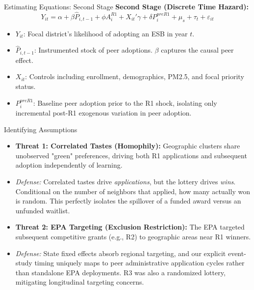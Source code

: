 \documentclass[aspectratio=169]{beamer}
\begin{document}
\begin{frame}{Estimating Equations: Second Stage}
    \textbf{Second Stage (Discrete Time Hazard):}
    $$ Y_{it} = \alpha + \beta \widehat{P}_{i,t-1} + \phi A_i^{R1} + X_{it}'\gamma + \delta P_i^{preR1} + \mu_s + \tau_t + \varepsilon_{it} $$
    
    \begin{itemize}
        \item \textbf{$Y_{it}$}: Focal district's likelihood of adopting an ESB in year $t$.
        \item \textbf{$\widehat{P}_{i,t-1}$}: Instrumented stock of peer adoptions. $\beta$ captures the causal peer effect.
        \item \textbf{$X_{it}$}: Controls including enrollment, demographics, PM2.5, and focal priority status.
        \item \textbf{$P_i^{preR1}$}: Baseline peer adoption prior to the R1 shock, isolating only incremental post-R1 exogenous variation in peer adoption.
    \end{itemize}
\end{frame}

\begin{frame}{Identifying Assumptions}
    \begin{itemize}
        \item \textbf{Threat 1: Correlated Tastes (Homophily):} Geographic clusters share unobserved "green" preferences, driving both R1 applications and subsequent adoption independently of learning.
        \item \textit{Defense:} Correlated tastes drive \textit{applications}, but the lottery drives \textit{wins}. Conditional on the number of neighbors that applied, how many actually won is random. This perfectly isolates the spillover of a funded award versus an unfunded waitlist.
        \vspace{0.2cm}
        \item \textbf{Threat 2: EPA Targeting (Exclusion Restriction):} The EPA targeted subsequent competitive grants (e.g., R2) to geographic areas near R1 winners.
        \item \textit{Defense:} State fixed effects absorb regional targeting, and our explicit event-study timing uniquely maps to peer administrative application cycles rather than standalone EPA deployments. R3 was also a randomized lottery, mitigating longitudinal targeting concerns.
    \end{itemize}
\end{frame}
\end{document}
